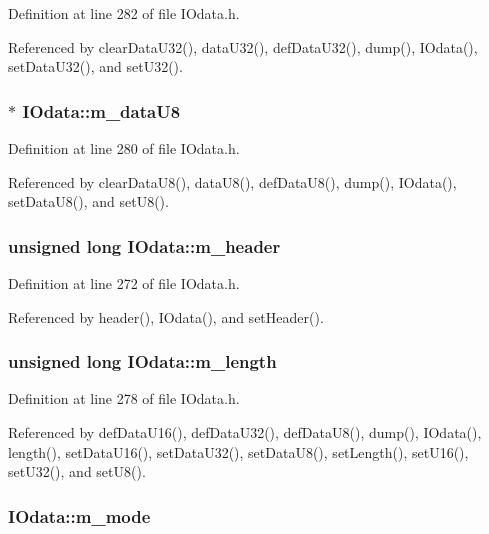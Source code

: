Definition at line 282 of file IOdata.h.

Referenced by clearDataU32(), dataU32(), defDataU32(), dump(), IOdata(), setDataU32(), and setU32().\hypertarget{classIOdata_a9c4c0dc5104f7f3b170e30ab78fe61e7}{
\subsubsection[{m\_\-dataU8}]{$\ast$ {\bf IOdata::m\_\-dataU8}}}
\label{classIOdata_a9c4c0dc5104f7f3b170e30ab78fe61e7}


Definition at line 280 of file IOdata.h.

Referenced by clearDataU8(), dataU8(), defDataU8(), dump(), IOdata(), setDataU8(), and setU8().\hypertarget{classIOdata_a46ec7dbfa257c02be1d39c4799f157d3}{
\subsubsection[{m\_\-header}]{\setlength{\rightskip}{0pt plus 5cm}unsigned long {\bf IOdata::m\_\-header}}}
\label{classIOdata_a46ec7dbfa257c02be1d39c4799f157d3}


Definition at line 272 of file IOdata.h.

Referenced by header(), IOdata(), and setHeader().\hypertarget{classIOdata_afabe57441da019eb614d277799106aac}{
\subsubsection[{m\_\-length}]{\setlength{\rightskip}{0pt plus 5cm}unsigned long {\bf IOdata::m\_\-length}}}
\label{classIOdata_afabe57441da019eb614d277799106aac}


Definition at line 278 of file IOdata.h.

Referenced by defDataU16(), defDataU32(), defDataU8(), dump(), IOdata(), length(), setDataU16(), setDataU32(), setDataU8(), setLength(), setU16(), setU32(), and setU8().\hypertarget{classIOdata_a0782e31763fa855f1ecbd377dce538e6}{
\subsubsection[{m\_\-mode}]{ {\bf IOdata::m\_\-mode}}}
\label{classIOdata_a0782e31763fa855f1ecbd377dce538e6}


